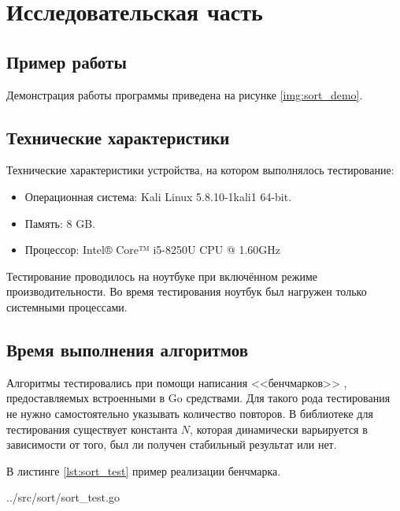 \chapter{Исследовательская часть}

\section{Пример работы}

Демонстрация работы программы приведена на рисунке \ref{img:sort_demo}.


\section{Технические характеристики}

Технические характеристики устройства, на котором выполнялось тестирование:

\begin{itemize}
	\item Операционная система: Kali \cite{kali} Linux \cite{linux} 5.8.10-1kali1 64-bit.
	\item Память: 8 GB.
	\item Процессор: Intel® Core™ i5-8250U \cite{intel} CPU @ 1.60GHz
\end{itemize}

Тестирование проводилось на ноутбуке при включённом режиме производительности. Во время тестирования ноутбук был нагружен только системными процессами.

\section{Время выполнения алгоритмов}

Алгоритмы тестировались при помощи написания <<бенчмарков>> \cite{gotest}, предоставляемых встроенными в Go средствами. Для такого рода тестирования не нужно самостоятельно указывать количество повторов. В библиотеке для тестирования существует константа $N$, которая динамически варьируется в зависимости от того, был ли получен стабильный результат или нет.

В листинге \ref{lst:sort_test} пример реализации бенчмарка.

\begin{lstinputlisting}[
	caption={Реализация бенчмарка},
	label={lst:sort_test},
	style={go},
	linerange={7-13},
	]{../src/sort/sort_test.go}
\end{lstinputlisting}

